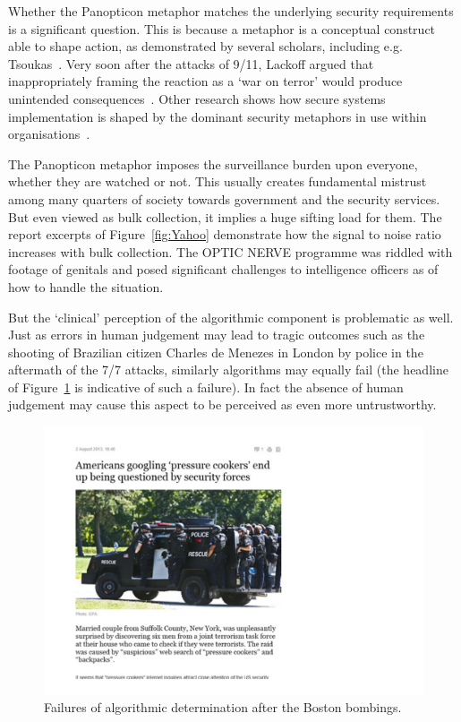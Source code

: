 \documentclass{llncs}
\begin{document}
Whether the Panopticon metaphor matches the underlying security requirements is a significant question. This is because a metaphor is a conceptual construct able to shape action, as demonstrated by several scholars, including e.g. Tsoukas~\cite{Tsoukas}. Very soon after the attacks of 9/11, Lackoff argued that inappropriately framing the reaction as a `war on terror' would produce unintended consequences~\cite{Lackoff}. Other research shows how secure systems implementation is shaped by the dominant security metaphors in use within organisations~\cite{Tryfonas}.

The Panopticon metaphor imposes the surveillance burden upon everyone, whether they are watched or not. This usually creates fundamental mistrust among many quarters of society towards government and the security services. But even viewed as bulk collection, it implies a huge sifting load for them. The report excerpts of Figure~\ref{fig:Yahoo} demonstrate how the signal to noise ratio increases with bulk collection. The OPTIC NERVE programme was riddled with footage of genitals and posed significant challenges to intelligence officers as of how to handle the situation.

But the `clinical' perception of the algorithmic component is problematic as well. Just as errors in human judgement may lead to tragic outcomes such as the shooting of Brazilian citizen Charles de Menezes in London by police in the aftermath of the 7/7 attacks, similarly algorithms may equally fail (the headline of Figure~\ref{fig:Algo} is indicative of such a failure). In fact the absence of human judgement may cause this aspect to be perceived as even more untrustworthy. 

\begin{figure}[ht]
\begin{center}
\includegraphics[width=\textwidth]{images/fig3}
\caption{Failures of algorithmic determination after the Boston bombings.}
\label{fig:Algo}
\end{center}
\end{figure}
\end{document}
